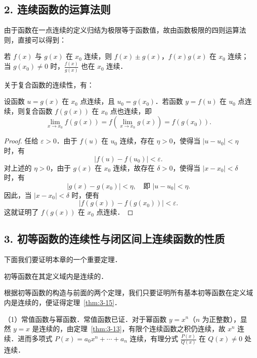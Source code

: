 \subsection*{2. 连续函数的运算法则}

由于函数在一点连续的定义归结为极限等于函数值，故由函数极限的四则运算法则，直接可以得到：

\begin{theorem}\label{thm:3-13}
若 $f(x)$ 与 $g(x)$ 在 $x_0$ 连续，则 $f(x) \pm g(x)$，$f(x)g(x)$ 在 $x_0$ 连续；当 $g(x_0) \neq 0$ 时，$\frac{f(x)}{g(x)}$ 也在 $x_0$ 连续．
\end{theorem}

关于复合函数的连续性，有：

\begin{theorem}\label{thm:3-14}
设函数 $u = g(x)$ 在 $x_0$ 点连续，且 $u_0 = g(x_0)$．若函数 $y = f(u)$ 在 $u_0$ 点连续，则复合函数 $f(g(x))$ 在 $x_0$ 点也连续，即
\[
\lim_{x \to x_0} f(g(x)) = f\left(\lim_{x \to x_0} g(x)\right) = f(g(x_0)).
\]
\end{theorem}

\begin{proof}
任给 $\varepsilon > 0$．由于 $f(u)$ 在 $u_0$ 连续，存在 $\eta > 0$，使得当 $|u - u_0| < \eta$ 时，有
\[
|f(u) - f(u_0)| < \varepsilon.
\]
对上述的 $\eta > 0$，由于 $g(x)$ 在 $x_0$ 连续，故存在 $\delta > 0$，使得当 $|x - x_0| < \delta$ 时，有
\[
|g(x) - g(x_0)| < \eta, \quad \text{即 } |u - u_0| < \eta.
\]
因此，当 $|x - x_0| < \delta$ 时，便有
\[
|f(g(x)) - f(g(x_0))| < \varepsilon.
\]
这就证明了 $f(g(x))$ 在 $x_0$ 点连续．
\end{proof}

\subsection*{3. 初等函数的连续性与闭区间上连续函数的性质}

下面我们要证明本章的一个重要定理．

\begin{theorem}\label{thm:3-15}
初等函数在其定义域内是连续的．
\end{theorem}

根据初等函数的构造与前面的两个定理，我们只要证明所有基本初等函数在定义域内是连续的，便证得定理~\ref{thm:3-15}．

（1）常值函数与幂函数．常值函数已证．对于幂函数 $y = x^n$（$n$ 为正整数），显然 $y = x$ 是连续的，由定理~\ref{thm:3-13}，有限个连续函数之积仍连续，故 $x^n$ 连续．进而多项式 $P(x) = a_0 x^n + \cdots + a_n$ 连续，有理分式 $\frac{P(x)}{Q(x)}$ 在 $Q(x) \neq 0$ 处连续．

